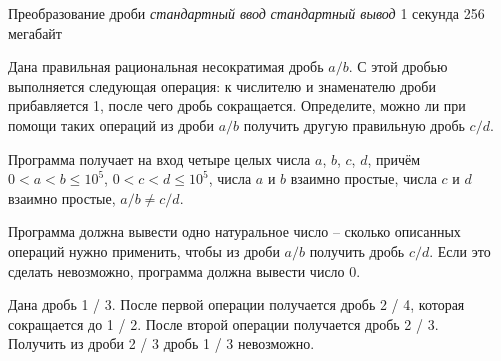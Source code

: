\begin{problem}%
{Преобразование дроби}%
{\textsl{стандартный ввод}}%
{\textsl{стандартный вывод}}%
{1 секунда}%
{256 мегабайт}{}

Дана правильная рациональная несократимая дробь $a / b$. С этой дробью выполняется следующая операция: к числителю и знаменателю дроби прибавляется 1, после чего дробь сокращается. Определите, можно ли при помощи таких операций из дроби $a / b$ получить другую правильную дробь $c / d$.

\InputFile

Программа получает на вход четыре целых числа $a$, $b$, $c$, $d$, причём $0 < a < b \le 10^5$, $0 < c < d \le 10^5$, числа $a$ и $b$ взаимно простые, числа $c$ и $d$ взаимно простые, $a / b \ne c / d$.

\OutputFile

Программа должна вывести одно натуральное число – сколько описанных операций нужно применить, чтобы из дроби $a / b$ получить дробь $c / d$. Если это сделать невозможно, программа должна вывести число 0.

\Examples

\begin{example}
%
%
\end{example}

\Explanations

Дана дробь 1 / 3. После первой операции получается дробь
2 / 4, которая сокращается до 1 / 2. После второй операции
получается дробь 2 / 3.\\

Получить из дроби 2 / 3 дробь 1 / 3 невозможно.

\end{problem}
